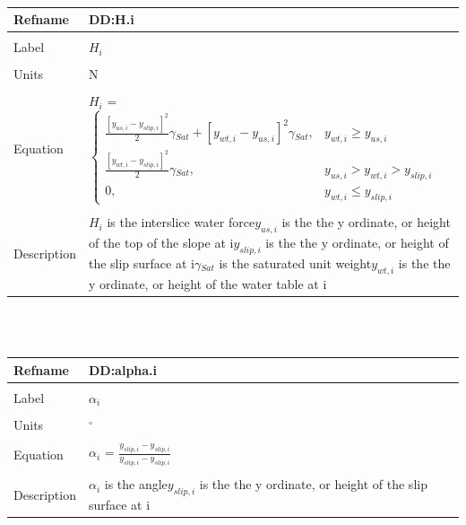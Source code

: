 \documentclass[12pt]{article}
\begin{document}
~\newline
\noindent \begin{minipage}{\textwidth}
\begin{tabular}{p{} p{}}
\toprule \textbf{Refname} & \textbf{DD:H.i}
\label{DD:H.i}
\\ \midrule \\
Label & $H_{i}$
\\ \midrule \\
Units & N
\\ \midrule \\
Equation & $H_{i}$ = $\begin{cases}
\frac{\left[y_{us,i}-y_{slip,i}\right]^{2}}{2}\gamma{}_{Sat}+\left[y_{wt,i}-y_{us,i}\right]^{2}\gamma{}_{Sat}, & y_{wt,i}\geq{}y_{us,i}\\
\frac{\left[y_{wt,i}-y_{slip,i}\right]^{2}}{2}\gamma{}_{Sat}, & y_{us,i}>y_{wt,i}>y_{slip,i}\\
0, & y_{wt,i}\leq{}y_{slip,i}
\end{cases}$
\\ \midrule \\
Description & $H_{i}$ is the interslice water force\newline$y_{us,i}$ is the the y ordinate, or height of the top of the slope at i\newline$y_{slip,i}$ is the the y ordinate, or height of the slip surface at i\newline$\gamma{}_{Sat}$ is the saturated unit weight\newline$y_{wt,i}$ is the the y ordinate, or height of the water table at i
\\ \bottomrule \end{tabular}
\end{minipage}\\
~\newline
\noindent \begin{minipage}{\textwidth}
\begin{tabular}{p{} p{}}
\toprule \textbf{Refname} & \textbf{DD:alpha.i}
\label{DD:alpha.i}
\\ \midrule \\
Label & $\alpha{}_{i}$
\\ \midrule \\
Units & ${}^{\circ}$
\\ \midrule \\
Equation & $\alpha{}_{i}$ = $\frac{y_{slip,i}-y_{slip,i}}{y_{slip,i}-y_{slip,i}}$
\\ \midrule \\
Description & $\alpha{}_{i}$ is the angle\newline$y_{slip,i}$ is the the y ordinate, or height of the slip surface at i
\\ \bottomrule \end{tabular}
\end{minipage}\\
\end{document}
